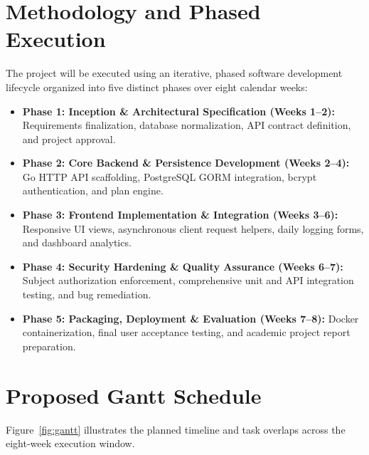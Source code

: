 \documentclass[11pt,a4paper]{report}
\begin{document}
\section{Methodology and Phased Execution}
The project will be executed using an iterative, phased software development lifecycle organized into five distinct phases over eight calendar weeks:
\begin{itemize}
  \item \textbf{Phase 1: Inception \& Architectural Specification (Weeks 1--2):} Requirements finalization, database normalization, API contract definition, and project approval.
  \item \textbf{Phase 2: Core Backend \& Persistence Development (Weeks 2--4):} Go HTTP API scaffolding, PostgreSQL GORM integration, bcrypt authentication, and plan engine.
  \item \textbf{Phase 3: Frontend Implementation \& Integration (Weeks 3--6):} Responsive UI views, asynchronous client request helpers, daily logging forms, and dashboard analytics.
  \item \textbf{Phase 4: Security Hardening \& Quality Assurance (Weeks 6--7):} Subject authorization enforcement, comprehensive unit and API integration testing, and bug remediation.
  \item \textbf{Phase 5: Packaging, Deployment \& Evaluation (Weeks 7--8):} Docker containerization, final user acceptance testing, and academic project report preparation.
\end{itemize}

\section{Proposed Gantt Schedule}
Figure~\ref{fig:gantt} illustrates the planned timeline and task overlaps across the eight-week execution window.
\end{document}
